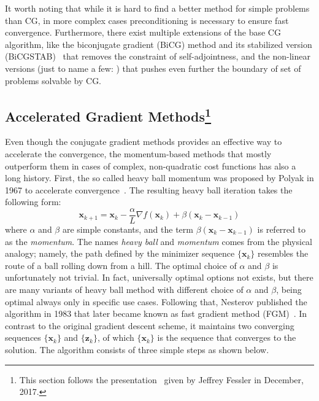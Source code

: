 It worth noting that while it is hard to find a better method for simple problems than CG, in more complex cases preconditioning is necessary to ensure fast convergence. Furthermore, there exist multiple extensions of the base CG algorithm, like the biconjugate gradient (BiCG) method and its stabilized version (BiCGSTAB)~\cite{van_der_vorst_bicgstab_1992} that removes the constraint of self-adjointness, and the non-linear versions (just to name a few: \cite{fletcher_function_1964, polak_note_1969, dai_nonlinear_1999}) that pushes even further the boundary of set of problems solvable by CG.

\subsection[Accelerated Gradient Methods]{Accelerated Gradient Methods\footnote{This section follows the presentation~\cite{kim_optimal_2017} given by Jeffrey Fessler in December, 2017.}}

Even though the conjugate gradient methods provides an effective way to accelerate the convergence, the momentum-based methods that mostly outperform them in cases of complex, non-quadratic cost functions has also a long history. First, the so called heavy ball momentum was proposed by Polyak in 1967 to accelerate convergence~\cite{polyak_methods_1964}. The resulting heavy ball iteration takes the following form:
\[\mathbf{x}_{k+1} = \mathbf{x}_k - \frac{\alpha}{L}\nabla f(\mathbf{x}_k) + \beta (\mathbf{x}_k - \mathbf{x}_{k-1})\]
where $\alpha$ and $\beta$ are simple constants, and the term $\beta (\mathbf{x}_k - \mathbf{x}_{k-1})$ is referred to as the \textit{momentum}. The names \textit{heavy ball} and \textit{momentum} comes from the physical analogy; namely, the path defined by the minimizer sequence $\{\mathbf{x}_k\}$ resembles the route of a ball rolling down from a hill. The optimal choice of $\alpha$ and $\beta$ is unfortunately not trivial. In fact, universally optimal options not exists, but there are many variants of heavy ball method with different choice of $\alpha$ and $\beta$, being optimal always only in specific use cases. Following that, Nesterov published the algorithm in 1983 that later became known as fast gradient method (FGM)~\cite{nesterov_method_1983}. In contrast to the original gradient descent scheme, it maintains two converging sequences $\{\mathbf{x}_k\}$ and $\{\mathbf{z}_k\}$, of which $\{\mathbf{x}_k\}$ is the sequence that converges to the solution. The algorithm consists of three simple steps as shown below.

